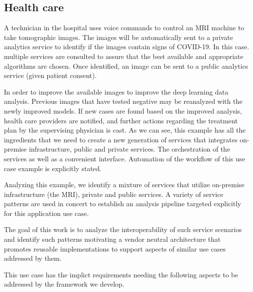\subsection{Health care}


A technician in the hospital uses voice commands to control an MRI
machine to take tomographic images. The images will be automatically
sent to a private analytics service to identify if the images contain
signs of COVID-19. In this case. multiple services are consulted to
assure that the best available and appropriate algorithms are chosen.
Once identified, an image can be sent to a public analytics service
(given patient consent).


In order to improve the available images to improve the deep learning
data analysis. Previous images that have tested negative may be
reanalyzed with the newly improved models. If new cases are found
based on the improved analysis, health care providers are notified,
and further actions regarding the treatment plan by the supervising
physician is cast. As we can see, this example has all the ingredients
that we need to create a new generation of services that integrates
on-premise infrastructure, public and private services. The
orchestration of the services as well as a convenient
interface. Automation of the workflow of this use case example is
explicitly stated.

Analyzing this example, we identify a mixture of services that utilize
on-premise infrastructure (the MRI), private and public services. A
variety of service patterns are used in concert to establish an analysis
pipeline targeted explicitly for this application use case. 

The goal of this work is to analyze the interoperability of such
service scenarios and identify such patterns motivating a vendor
neutral architecture that promotes reusable implementations to 
support aspects of similar use cases addressed by them.


This use case has the implict requirements needing the following
aspects to be addressed by the framework we develop.

